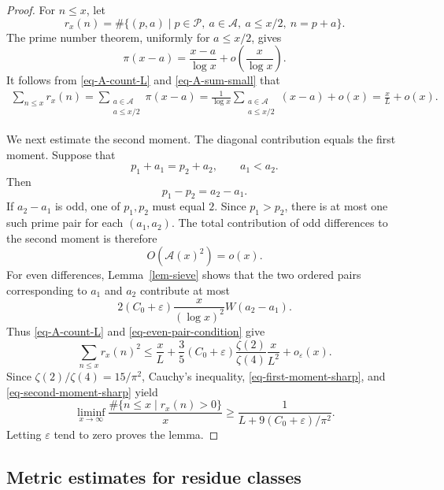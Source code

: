 \documentclass[11pt,reqno]{amsart}
\numberwithin{equation}{section}
\begin{document}
    \begin{proof}
        For $n\le x$, let
        $$
        r_x(n)=\#\{(p,a)\mid p\in\mathcal{P},\ a\in\mathcal{A},\ a\le x/2,\ n=p+a\}.
        $$
        The prime number theorem, uniformly for $a\le x/2$, gives
        $$
        \pi(x-a)=\frac{x-a}{\log x}+o\left(\frac{x}{\log x}\right).
        $$
        It follows from \eqref{eq-A-count-L} and \eqref{eq-A-sum-small} that
        \begin{align}\label{eq-first-moment-sharp}
            \sum_{n\le x}r_x(n)
            =\sum_{\substack{a\in\mathcal{A}\\a\le x/2}}\pi(x-a)
            =\frac{1}{\log x}
            \sum_{\substack{a\in\mathcal{A}\\a\le x/2}}(x-a)+o(x)
            =\frac{x}{L}+o(x).
        \end{align}

        We next estimate the second moment. The diagonal contribution equals the first moment. Suppose that
        $$
        p_1+a_1=p_2+a_2,\qquad a_1<a_2.
        $$
        Then
        $$
        p_1-p_2=a_2-a_1.
        $$
        If $a_2-a_1$ is odd, one of $p_1,p_2$ must equal $2$. Since $p_1>p_2$, there is at most one such prime pair for each $(a_1,a_2)$. The total contribution of odd differences to the second moment is therefore
        $$
        O(\mathcal{A}(x)^2)=o(x).
        $$
        For even differences, Lemma~\ref{lem-sieve} shows that the two ordered pairs corresponding to $a_1$ and $a_2$ contribute at most
        $$
        2(C_0+\varepsilon)\frac{x}{(\log x)^2}
        W(a_2-a_1).
        $$
        Thus \eqref{eq-A-count-L} and \eqref{eq-even-pair-condition} give
        \begin{equation}\label{eq-second-moment-sharp}
            \sum_{n\le x}r_x(n)^2
            \le \frac{x}{L}
            +\frac35(C_0+\varepsilon)\frac{\zeta(2)}{\zeta(4)}\frac{x}{L^2}
            +o_{\varepsilon}(x).
        \end{equation}
        Since $\zeta(2)/\zeta(4)=15/\pi^2$, Cauchy's inequality, \eqref{eq-first-moment-sharp}, and \eqref{eq-second-moment-sharp} yield
        $$
        \liminf_{x\to\infty}
        \frac{\#\{n\le x\mid r_x(n)>0\}}x
        \ge \frac{1}{L+9(C_0+\varepsilon)/\pi^2}.
        $$
        Letting $\varepsilon$ tend to zero proves the lemma.
    \end{proof}

    \subsection{Metric estimates for residue classes}
\end{document}
